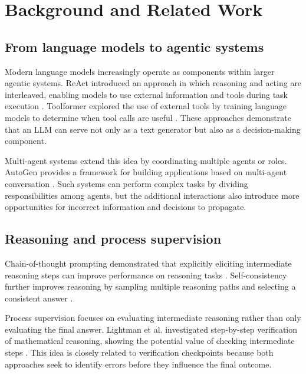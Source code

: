 \documentclass[12pt]{article}
\begin{document}
\section{Background and Related Work}
\label{sec:background}

\subsection{From language models to agentic systems}
\label{sec:agentic-systems}

Modern language models increasingly operate as components within larger agentic
systems. ReAct introduced an approach in which reasoning and acting are
interleaved, enabling models to use external information and tools during task
execution \cite{yao2023react}. Toolformer explored the use of external tools by
training language models to determine when tool calls are useful
\cite{schick2023toolformer}. These approaches demonstrate that an LLM can serve
not only as a text generator but also as a decision-making component.

Multi-agent systems extend this idea by coordinating multiple agents or roles.
AutoGen provides a framework for building applications based on multi-agent
conversation \cite{wu2023autogen}. Such systems can perform complex tasks by
dividing responsibilities among agents, but the additional interactions also
introduce more opportunities for incorrect information and decisions to
propagate.

\subsection{Reasoning and process supervision}
\label{sec:process-supervision}

Chain-of-thought prompting demonstrated that explicitly eliciting intermediate
reasoning steps can improve performance on reasoning tasks
\cite{wei2022cot}. Self-consistency further improves reasoning by sampling
multiple reasoning paths and selecting a consistent answer
\cite{wang2023selfconsistency}.

Process supervision focuses on evaluating intermediate reasoning rather than
only evaluating the final answer. Lightman et al. investigated step-by-step
verification of mathematical reasoning, showing the potential value of checking
intermediate steps \cite{lightman2023verify}. This idea is closely related to
verification checkpoints because both approaches seek to identify errors before
they influence the final outcome.
\end{document}
